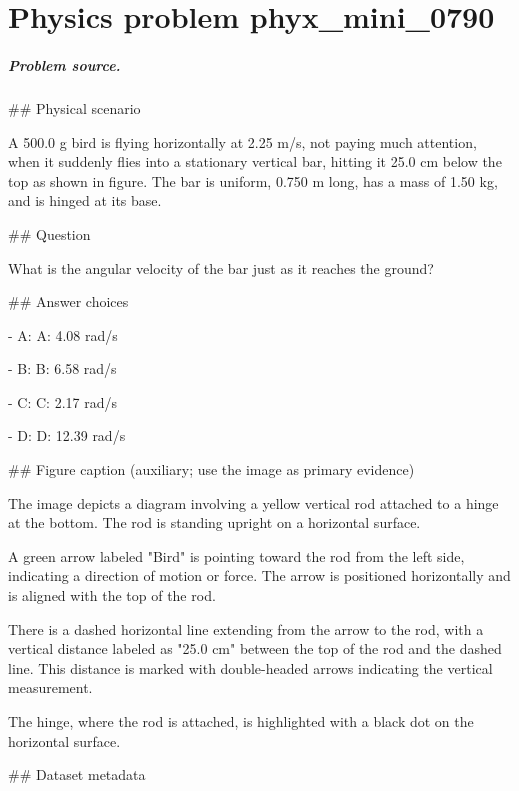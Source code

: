 
\chapter{Physics problem phyx\_mini\_0790}
\label{ch:PhyXMiniProblems_problem_phyx_mini_0790}

\paragraph{Problem source.}
\#\# Physical scenario

A 500.0 g bird is flying horizontally at 2.25 m/s, not paying much attention, when it suddenly flies into a stationary vertical bar, hitting it 25.0 cm below the top as shown in figure. The bar is uniform, 0.750 m long, has a mass of 1.50 kg, and is hinged at its base.

\#\# Question

What is the angular velocity of the bar just as it reaches the ground?

\#\# Answer choices

- A: A: 4.08 rad/s

- B: B: 6.58 rad/s

- C: C: 2.17 rad/s

- D: D: 12.39 rad/s

\#\# Figure caption (auxiliary; use the image as primary evidence)

The image depicts a diagram involving a yellow vertical rod attached to a hinge at the bottom. The rod is standing upright on a horizontal surface. 

A green arrow labeled "Bird" is pointing toward the rod from the left side, indicating a direction of motion or force. The arrow is positioned horizontally and is aligned with the top of the rod.

There is a dashed horizontal line extending from the arrow to the rod, with a vertical distance labeled as "25.0 cm" between the top of the rod and the dashed line. This distance is marked with double-headed arrows indicating the vertical measurement. 

The hinge, where the rod is attached, is highlighted with a black dot on the horizontal surface.

\#\# Dataset metadata

